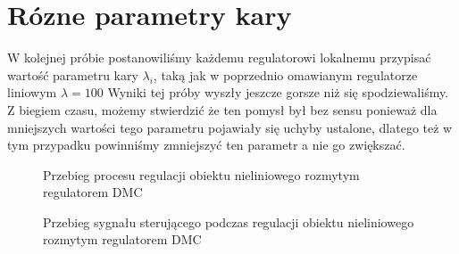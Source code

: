 \section{Rózne parametry kary}

W kolejnej próbie postanowiliśmy każdemu regulatorowi lokalnemu przypisać wartość parametru kary $\lambda_{i}$,
taką jak w poprzednio omawianym regulatorze liniowym $\lambda = \num{100}$ Wyniki tej próby wyszły jeszcze gorsze niż się spodziewaliśmy.
Z biegiem czasu, możemy stwierdzić że ten pomysł był bez sensu ponieważ dla mniejszych wartości tego parametru pojawiały się 
uchyby ustalone, dlatego też w tym przypadku powinniśmy zmniejszyć ten parametr a nie go zwiększać.

\begin{figure}[t]
    \centering
    \caption{Przebieg procesu regulacji obiektu nieliniowego rozmytym regulatorem DMC}
    \label{dr_21_y}
\end{figure}

\begin{figure}[b]
    \centering
    \caption{Przebieg sygnału sterującego podczas regulacji obiektu nieliniowego rozmytym regulatorem DMC}
    \label{dr_2_u}
\end{figure}

